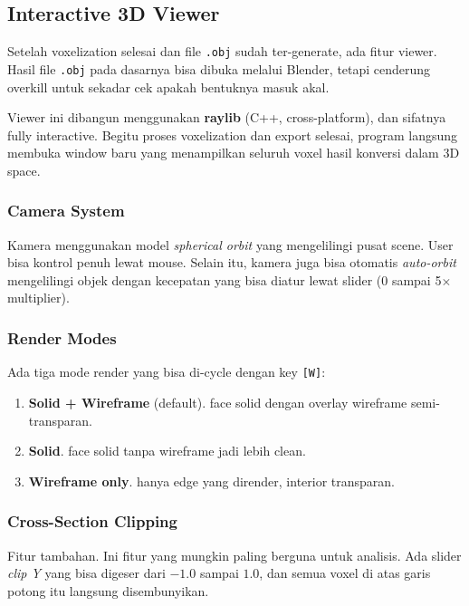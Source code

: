 \documentclass[11pt,a4paper]{article}
\begin{document}
\subsection{Interactive 3D Viewer}

Setelah voxelization selesai dan file \texttt{.obj} sudah ter-generate, ada fitur viewer.
Hasil file \texttt{.obj} pada dasarnya bisa dibuka melalui Blender, tetapi cenderung overkill
untuk sekadar cek apakah bentuknya masuk akal.

Viewer ini dibangun menggunakan \textbf{raylib} (C++, cross-platform), dan
sifatnya fully interactive. Begitu proses voxelization dan export selesai, program langsung
membuka window baru yang menampilkan seluruh voxel hasil konversi dalam 3D space.

\subsubsection*{Camera System}

Kamera menggunakan model \textit{spherical orbit} yang mengelilingi pusat scene.
User bisa kontrol penuh lewat mouse. Selain itu, kamera juga bisa otomatis \textit{auto-orbit}
mengelilingi objek dengan kecepatan yang bisa diatur lewat slider (0 sampai 5$\times$ multiplier).

\subsubsection*{Render Modes}

Ada tiga mode render yang bisa di-cycle dengan key \texttt{[W]}:

\begin{enumerate}
    \item \textbf{Solid + Wireframe} (default). face solid dengan overlay wireframe semi-transparan.
    \item \textbf{Solid}. face solid tanpa wireframe jadi lebih clean.
    \item \textbf{Wireframe only}. hanya edge yang dirender, interior transparan.
\end{enumerate}

\subsubsection*{Cross-Section Clipping}

Fitur tambahan. Ini fitur yang mungkin paling berguna untuk analisis. Ada slider \textit{clip Y}
yang bisa digeser dari $-1.0$ sampai $1.0$, dan semua voxel di atas garis potong
itu langsung disembunyikan.
\end{document}

